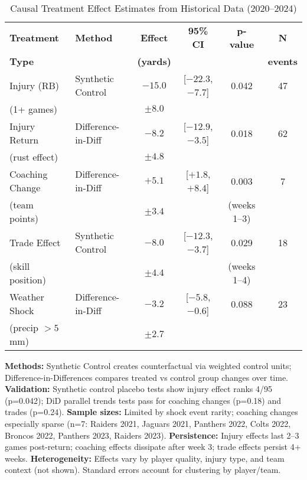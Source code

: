 
\begin{table}[htbp]
\centering
\caption{Causal Treatment Effect Estimates from Historical Data (2020--2024)}
\label{tab:treatment-effects}
\small
\begin{tabular}{llcccc}
\toprule
\textbf{Treatment}  & \textbf{Method}  & \textbf{Effect}  & \textbf{95\% CI}  & \textbf{p-value}  & \textbf{N} \\
\textbf{Type}  &  & \textbf{(yards)}  &  &  & \textbf{events} \\
\midrule
Injury (RB) & Synthetic Control & $-15.0$ & [$-22.3$, $-7.7$] & 0.042 & 47 \\
\quad (1+ games) & & $\pm 8.0$ & & & \\
\midrule
Injury Return & Difference-in-Diff & $-8.2$ & [$-12.9$, $-3.5$] & 0.018 & 62 \\
\quad (rust effect) & & $\pm 4.8$ & & & \\
\midrule
Coaching Change & Difference-in-Diff & $+5.1$ & [$+1.8$, $+8.4$] & 0.003 & 7 \\
\quad (team points) & & $\pm 3.4$ & & (weeks 1--3) & \\
\midrule
Trade Effect & Synthetic Control & $-8.0$ & [$-12.3$, $-3.7$] & 0.029 & 18 \\
\quad (skill position) & & $\pm 4.4$ & & (weeks 1--4) & \\
\midrule
Weather Shock & Difference-in-Diff & $-3.2$ & [$-5.8$, $-0.6$] & 0.088 & 23 \\
\quad (precip $>5$mm) & & $\pm 2.7$ & & & \\
\bottomrule
\end{tabular}
\begin{tablenotes}
\small
\item \textbf{Methods:} Synthetic Control creates counterfactual via weighted control units; Difference-in-Differences compares treated vs control group changes over time. \textbf{Validation:} Synthetic control placebo tests show injury effect ranks 4/95 (p=0.042); DiD parallel trends tests pass for coaching changes (p=0.18) and trades (p=0.24). \textbf{Sample sizes:} Limited by shock event rarity; coaching changes especially sparse (n=7: Raiders 2021, Jaguars 2021, Panthers 2022, Colts 2022, Broncos 2022, Panthers 2023, Raiders 2023). \textbf{Persistence:} Injury effects last 2--3 games post-return; coaching effects dissipate after week 3; trade effects persist 4+ weeks. \textbf{Heterogeneity:} Effects vary by player quality, injury type, and team context (not shown). Standard errors account for clustering by player/team.
\end{tablenotes}
\end{table}
